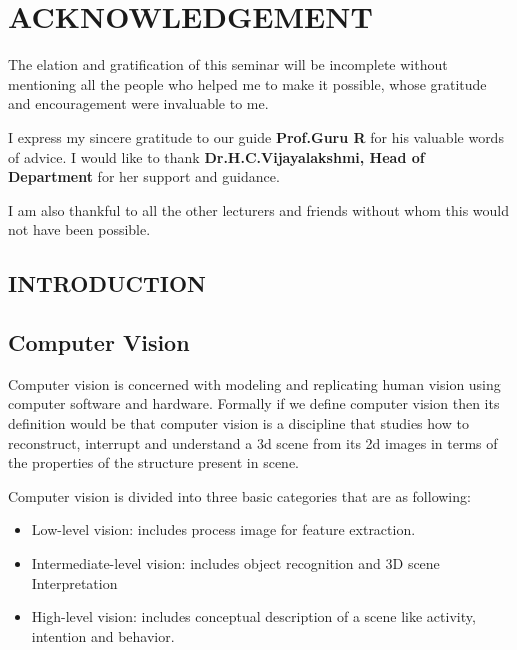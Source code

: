 \documentclass[12pt, a4paper]{article}
\begin{document}
\section{ACKNOWLEDGEMENT}
\par \vspace{0.25cm} The elation and gratification of this seminar will be incomplete without mentioning all the people who helped me to make it possible, whose gratitude and encouragement were invaluable to me.
\vspace{0.25cm}        
\par I express my sincere gratitude to our guide \textbf{Prof.Guru R} for his valuable words of advice. 
I would like to thank \textbf{Dr.H.C.Vijayalakshmi, Head of Department} for her support and guidance.
\vspace{0.25cm}  
    \par I am also thankful to all the other lecturers and friends without whom this would not have been possible.
\newpage
\tableofcontents
\newpage
\begin{Large}\section{INTRODUCTION}\end{Large}
\begin{large}\subsection{Computer Vision}\end{large}
\hspace{3cm}
Computer vision is concerned with modeling and replicating human vision using computer software and hardware. Formally if we define computer vision then its definition would be that computer vision is a discipline that studies how to reconstruct, interrupt and understand a 3d scene from its 2d images in terms of the properties of the structure present in scene.
\par Computer vision is divided into three basic categories that are as following:
\begin{itemize}
\item Low-level vision: includes process image for feature extraction.
\item Intermediate-level vision: includes object recognition and 3D scene Interpretation
\item High-level vision: includes conceptual description of a scene like activity, intention and behavior.
\end{itemize}
\end{document}
